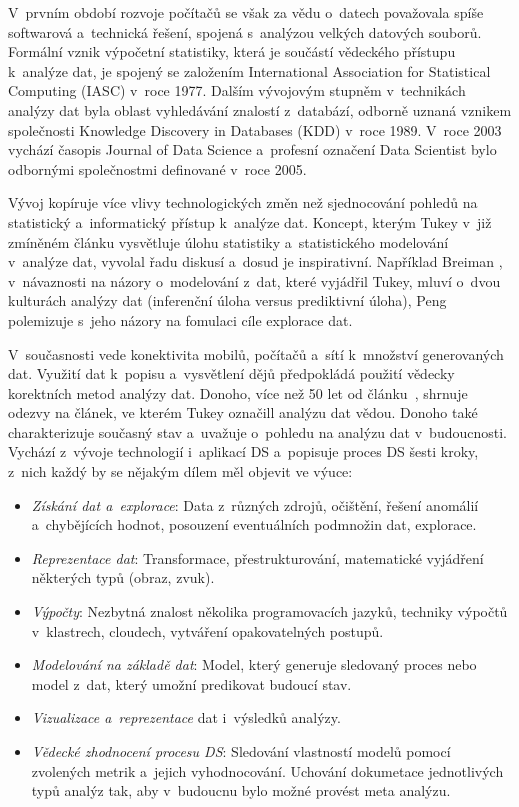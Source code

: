 V~prvním období rozvoje počítačů se však za vědu o~datech považovala spíše softwarová a~technická řešení, spojená s~analýzou velkých datových souborů. Formální vznik výpočetní statistiky, která je součástí vědeckého přístupu k~analýze dat, je spojený se založením International Association for Statistical Computing (IASC) v~roce 1977. Dalším vývojovým stupněm v~technikách analýzy dat byla oblast vyhledávání znalostí z~databází, odborně uznaná vznikem společnosti Knowledge Discovery in Databases (KDD) v~roce 1989. V~roce 2003 vychází časopis Journal of Data Science a~profesní označení Data Scientist bylo odbornými společnostmi definované v~roce 2005.  

Vývoj kopíruje více vlivy technologických změn než sjednocování pohledů na statistický a~informatický přístup k~analýze dat. Koncept, kterým Tukey v~již zmíněném článku \cite{tuk} vysvětluje úlohu statistiky a~statistického modelování v~analýze dat, vyvolal řadu diskusí a~dosud je inspirativní. Například Breiman \cite{bre}, v~návaznosti na názory o~modelování z~dat, které vyjádřil Tukey, mluví o~dvou kulturách analýzy dat (inferenční úloha versus prediktivní úloha), Peng \cite{pen} polemizuje s~jeho názory na fomulaci cíle explorace dat. 

V~současnosti vede konektivita mobilů, počítačů a~sítí k~množství generovaných dat. Využití dat k~popisu a~vysvětlení dějů předpokládá použití vědecky korektních metod analýzy dat. Donoho, více než 50 let od článku~\cite{tuk}, shrnuje odezvy na článek, ve kterém Tukey označill analýzu dat vědou. Donoho \cite{don} také charakterizuje současný stav a~uvažuje o~pohledu na analýzu dat v~budoucnosti. Vychází z~vývoje technologií i~aplikací DS a~popisuje proces DS šesti kroky, z~nich každý by se nějakým dílem měl objevit ve výuce: %
\begin{itemize}
\itemsep=-1pt
\item \textit{Získání dat a~explorace}: Data z~různých zdrojů, očištění, řešení anomálií a~chybějících hodnot, posouzení eventuálních podmnožin dat, explorace. 
\item \textit{Reprezentace dat}: Transformace, přestrukturování, matematické vyjádření některých typů (obraz, zvuk). 
\item \textit{Výpočty}: Nezbytná znalost několika programovacích jazyků, techniky výpočtů v~klastrech, cloudech, vytváření opakovatelných postupů. 
\item \textit{Modelování na základě dat}: Model, který generuje sledovaný proces nebo model z~dat, který umožní predikovat budoucí stav. 
\item \textit{Vizualizace a~reprezentace} dat i~výsledků analýzy. 
\item \textit{Vědecké zhodnocení procesu DS}: Sledování vlastností modelů pomocí zvolených metrik a~jejich vyhodnocování. Uchování dokumetace jednotlivých typů analýz tak, aby v~budoucnu bylo možné provést meta analýzu.
\end{itemize}

